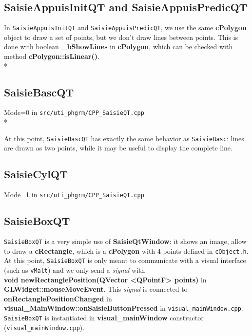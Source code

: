 \subsection{SaisieAppuisInitQT and SaisieAppuisPredicQT}

In {\tt SaisieAppuisInitQT} and {\tt SaisieAppuisPredicQT}, we use the same \textbf{cPolygon} object to draw a set of points, but we don't draw lines between points. This is done with boolean \textbf{\_bShowLines} in \textbf{cPolygon}, which can be checked with method \textbf{cPolygon::isLinear()}.\\*

\subsection{SaisieBascQT}
Mode=0 in {\tt src/uti\_phgrm/CPP\_SaisieQT.cpp} \\*

At this point, {\tt SaisieBascQT} has exactly the same behavior as {\tt SaisieBasc}: lines are drawn as two points, while it may be useful to display the complete line.

\subsection{SaisieCylQT}
Mode=1 in {\tt src/uti\_phgrm/CPP\_SaisieQT.cpp} 
\subsection{SaisieBoxQT}

{\tt SaisieBoxQT} is a very simple use of \textbf{SaisieQtWindow}: it shows an image, allow to draw a \textbf{ cRectangle}, which is a \textbf{cPolygon} with 4 points defined in {\tt cObject.h}. At this point, {\tt SaisieBoxQT} is only meant to communicate with a visual interface (such as {\tt vMalt}) and we only send a \textit{signal} with\\ \textbf{void newRectanglePosition(QVector <QPointF> points)} in \textbf{ GLWidget::mouseMoveEvent}. This \textit{signal} is connected to \textbf{onRectanglePositionChanged} in \textbf{visual\_MainWindow::onSaisieButtonPressed} in {\tt visual\_mainWindow.cpp}.
{\tt SaisieBoxQT} is instantiated in \textbf{visual\_mainWindow} constructor ({\tt visual\_mainWindow.cpp}).
